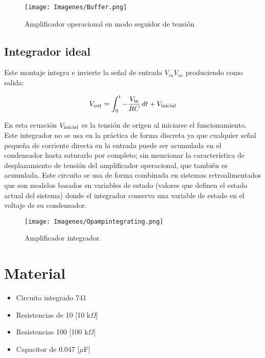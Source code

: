 \documentclass{article}
\begin{document}
\begin{figure}[h!]
    \centering
    \texttt{[image: Imagenes/Buffer.png]}
    \caption{Amplificador operacional en modo seguidor de tensión \citep{AmplificadorOperacional}}
    \label{fig:buffer}
\end{figure}

\subsection{Integrador ideal}

Este montaje integra e invierte la señal de entrada ${\displaystyle V_{in}} {\displaystyle V_{in}}$ produciendo como salida:

\begin{equation}
    {\displaystyle V_{\rm {out}}=\int _{0}^{t}-{V_{\rm {in}} \over RC}\,dt+V_{\rm {inicial}}} 
\end{equation}

En esta ecuación ${\displaystyle V_{\rm {inicial}}}$  es la tensión de origen al iniciarse el funcionamiento.\citep{AmplificadorOperacional}\\

Este integrador no se usa en la práctica de forma discreta ya que cualquier señal pequeña de corriente directa en la entrada puede ser acumulada en el condensador hasta saturarlo por completo; sin mencionar la característica de desplazamiento de tensión del amplificador operacional, que también es acumulada. Este circuito se usa de forma combinada en sistemas retroalimentados que son modelos basados en variables de estado (valores que definen el estado actual del sistema) donde el integrador conserva una variable de estado en el voltaje de su condensador.\citep{AmplificadorOperacional}

\begin{figure}[h!]
    \centering
    \texttt{[image: Imagenes/Opampintegrating.png]}
    \caption{Amplificador integrador.\citep{AmplificadorOperacional}}
    \label{fig:opAmpIntegrador}
\end{figure}

 
 \section{Material}

\begin{itemize}
    \item Circuito integrado 741
    \item Resistencias de 10 [10 k$\Omega$]
    \item Resistencias 100 [100 k$\Omega$]
    \item Capacitor de 0.047 [$\mu$F]
\end{itemize}
\end{document}
